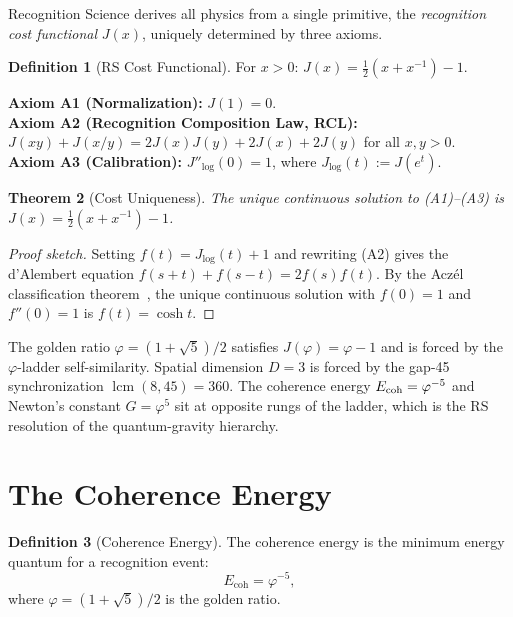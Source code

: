 \documentclass[12pt,a4paper]{article}
\newtheorem{theorem}{Theorem}[section]
\theoremstyle{definition}
\newtheorem{definition}[theorem]{Definition}
\theoremstyle{remark}
\begin{document}
Recognition Science derives all physics from a single primitive,
the \emph{recognition cost functional} $J(x)$, uniquely determined
by three axioms.

\begin{definition}[RS Cost Functional]
For $x > 0$: $J(x) = \tfrac{1}{2}(x + x^{-1}) - 1$.
\end{definition}

\noindent\textbf{Axiom A1 (Normalization):} $J(1) = 0$.\\
\textbf{Axiom A2 (Recognition Composition Law, RCL):}
$J(xy) + J(x/y) = 2J(x)J(y) + 2J(x) + 2J(y)$ for all $x, y > 0$.\\
\textbf{Axiom A3 (Calibration):} $J''_{\log}(0) = 1$, where
$J_{\log}(t) := J(e^t)$.

\begin{theorem}[Cost Uniqueness]
\label{thm:unique}
The unique continuous solution to \textup{(A1)--(A3)} is
$J(x) = \tfrac{1}{2}(x + x^{-1}) - 1$.
\end{theorem}

\begin{proof}[Proof sketch]
Setting $f(t) = J_{\log}(t) + 1$ and rewriting \textup{(A2)} gives
the d'Alembert equation $f(s+t) + f(s-t) = 2f(s)f(t)$.  By the
Acz\'el classification theorem~\cite{Aczel1966}, the unique continuous
solution with $f(0) = 1$ and $f''(0) = 1$ is $f(t) = \cosh t$.
\end{proof}

\noindent The golden ratio $\varphi = (1+\sqrt{5})/2$ satisfies
$J(\varphi) = \varphi - 1$ and is forced by the $\varphi$-ladder
self-similarity.  Spatial dimension $D = 3$ is forced by the gap-45
synchronization $\operatorname{lcm}(8, 45) = 360$.  The coherence
energy $E_{\rm coh} = \varphi^{-5}$ and Newton's constant $G = \varphi^5$
sit at opposite rungs of the ladder, which is the RS resolution of the
quantum-gravity hierarchy.

\section{The Coherence Energy}
\label{sec:ecoh}

\begin{definition}[Coherence Energy]
\label{def:ecoh}
The coherence energy is the minimum energy quantum for a
recognition event:
\begin{equation}
  E_{\mathrm{coh}} = \varphi^{-5},
\end{equation}
where $\varphi = (1+\sqrt{5})/2$ is the golden ratio.
\end{definition}
\end{document}
